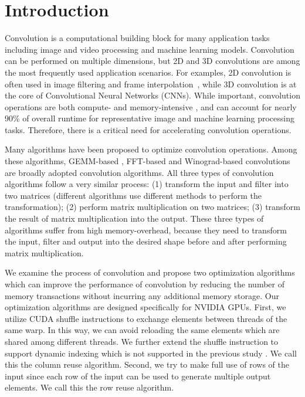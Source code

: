 \section{Introduction}
Convolution is a computational building block for many application tasks including image and video processing and machine learning
models\FIXME{\cite{}}. Convolution can be performed on multiple dimensions, but 2D and 3D convolutions are among the most frequently used
application scenarios. For examples, 2D convolution is often used in image filtering and frame
interpolation~\cite{Perrot2014Fine,Ma2014Optimized,Rudi2015Image,Niklaus2017Video}, while 3D convolution is at the core of Convolutional
Neural Networks (CNNs). While important, convolution operations are both compute- and memory-intensive \cite{cavigelli2015accelerating},
and can account for nearly 90\% of overall runtime \cite{Li2016Performance} for representative image and machine learning processing tasks.
Therefore, there is a critical need for accelerating convolution operations.


 Many algorithms \cite{Iandola2014Communication}
\cite{vasilache2014fast} \cite{lavin2016fast} \cite{cho2017mec} \cite{Zhen2018Optimizing} \cite{Vasudevan2017Parallel}
\cite{Chellapilla2006High} have been proposed to optimize convolution operations. Among these algorithms, GEMM-based
\cite{Vasudevan2017Parallel} \cite{Chellapilla2006High}, FFT-based \cite{vasilache2014fast} and Winograd-based convolutions
\cite{lavin2016fast} are broadly adopted convolution algorithms. All three types of convolution algorithms follow a very similar process:
(1) transform the input and filter into two matrices (different algorithms use different methods to perform the transformation); (2)
perform matrix multiplication on two matrices; (3) transform the result of matrix multiplication into the output. These three types of
algorithms suffer from high memory-overhead, because they need to transform the input, filter and output into the desired shape before and
after performing matrix multiplication.

We examine the process of convolution and propose two optimization algorithms which can improve the performance of convolution by reducing
the number of memory transactions without incurring any additional memory storage. Our optimization algorithms are designed specifically
for NVIDIA GPUs. First, we utilize CUDA shuffle instructions to exchange elements between threads of the same warp. In this way, we can
avoid reloading the same elements which are shared among different threads. We further extend the shuffle instruction to support dynamic
indexing which is not supported in the previous study \cite{vasilache2014fast}. We call this the column reuse algorithm. Second, we try to
make full use of rows of the input since each row of the input can be used to generate multiple output elements. We call this the row reuse
algorithm.

